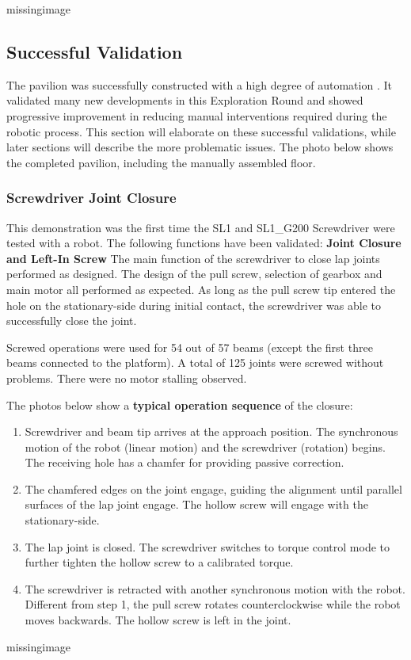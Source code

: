 missingimage

\subsection{Successful Validation}
\label{subsection:exploration_4_successful_validation}

The pavilion was successfully constructed with a high degree of automation . It validated many new developments in this Exploration Round and showed progressive improvement in reducing manual interventions required during the robotic process. This section will elaborate on these successful validations, while later sections will describe the more problematic issues.
The photo below shows the completed pavilion, including the manually assembled floor.

\subsubsection{Screwdriver Joint Closure}
\label{subsubsection:exploration_4_screwdriver_joint_closure}

This demonstration was the first time the SL1 and SL1\_G200 Screwdriver were tested with a robot. The following functions have been validated:
\textbf{Joint Closure and Left-In Screw}
The main function of the screwdriver to close lap joints performed as designed. The design of the pull screw, selection of gearbox and main motor all performed as expected. As long as the pull screw tip entered the hole on the stationary-side during initial contact, the screwdriver was able to successfully close the joint. 

Screwed operations were used for 54 out of 57 beams (except the first three beams connected to the platform). A total of 125 joints were screwed without problems. There were no motor stalling observed.

The photos below show a \textbf{typical operation sequence }of the closure:
\begin{enumerate}
    \item Screwdriver and beam tip arrives at the approach position. The synchronous motion of the robot (linear motion) and the screwdriver (rotation) begins. The receiving hole has a chamfer for providing passive correction.
    \item The chamfered edges on the joint engage, guiding the alignment until parallel surfaces of the lap joint engage. The hollow screw will engage with the stationary-side.
    \item The lap joint is closed. The screwdriver switches to torque control mode to further tighten the hollow screw to a calibrated torque.
    \item The screwdriver is retracted with another synchronous motion with the robot. Different from step 1, the pull screw rotates counterclockwise while the robot moves backwards. The hollow screw is left in the joint.
\end{enumerate}
missingimage

